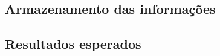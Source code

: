 \subsection{Armazenamento das informações}



\subsection{Resultados esperados}


\iffalse
Dados de treinamento e teste.
Definição de alarmes para alteração do valor de confiança.
\fi
